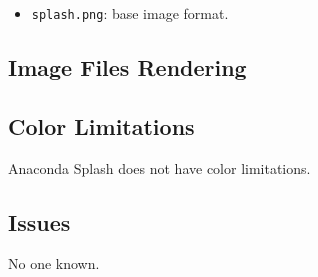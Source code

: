 \begin{itemize}
\item \texttt{splash.png}: base image format.
\end{itemize}

\subsection{Image Files Rendering}
\hypertarget{sec:Distribution:Anaconda:Splash:Identity:Issues}{}
\label{sec:Distribution:Anaconda:Splash:Identity:Issues}

\subsection{Color Limitations}
\hypertarget{sec:Distribution:Anaconda:Splash:Identity:Colors}{}
\label{sec:Distribution:Anaconda:Splash:Identity:Colors}

Anaconda Splash does not have color limitations. 

\subsection{Issues}
\hypertarget{sec:Distribution:Anaconda:Splash:Issues}{}
\label{sec:Distribution:Anaconda:Splash:Issues}

No one known.
